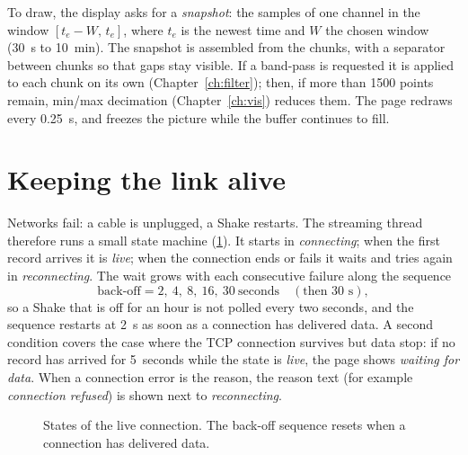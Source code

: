 To draw, the display asks for a \emph{snapshot}: the samples of one channel in the window $[t_e-W,\,t_e]$, where $t_e$
is the newest time and $W$ the chosen window (30~s to 10~min). The snapshot is assembled from the chunks, with a
 separator between chunks so that gaps stay visible. If a band-pass is requested it is applied to each chunk on
its own (Chapter~\ref{ch:filter}); then, if more than 1500 points remain, min/max decimation (Chapter~\ref{ch:vis})
reduces them. The page redraws every 0.25~s, and  freezes the picture while the buffer continues to fill.

\section{Keeping the link alive}
Networks fail: a cable is unplugged, a Shake restarts. The streaming thread therefore runs a small state machine
(\cref{fig:reconnect}). It starts in \emph{connecting}; when the first record arrives it is \emph{live}; when the
connection ends or fails it waits and tries again in \emph{reconnecting}. The wait grows with each consecutive failure along the
sequence
\begin{equation}
  \text{back-off} = 2,\ 4,\ 8,\ 16,\ 30\ \text{seconds}\quad(\text{then 30 s}),
\end{equation}
so a Shake that is off for an hour is not polled every two seconds, and the sequence restarts at 2~s as soon as a connection
has delivered data. A second condition covers the case where the TCP connection survives but data stop: if no record
has arrived for 5~seconds while the state is \emph{live}, the page shows \emph{waiting for data}. When a connection
error is the reason, the reason text (for example \emph{connection refused}) is shown next to \emph{reconnecting}.

\begin{figure}[tbp]
\centering
{}
\caption{States of the live connection. The back-off sequence resets when a connection has delivered data.}\label{fig:reconnect}
\end{figure}

